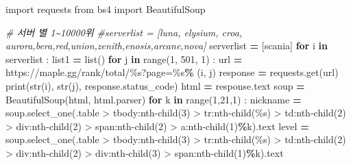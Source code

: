 \documentclass[
]{article}
\newenvironment{Shaded}{\begin{snugshade}}{\end{snugshade}}
\newcommand{\BuiltInTok}[1]{#1}
\newcommand{\CommentTok}[1]{\textcolor[rgb]{0.56,0.35,0.01}{\textit{#1}}}
\newcommand{\ControlFlowTok}[1]{\textcolor[rgb]{0.13,0.29,0.53}{\textbf{#1}}}
\newcommand{\DecValTok}[1]{\textcolor[rgb]{0.00,0.00,0.81}{#1}}
\newcommand{\ImportTok}[1]{#1}
\newcommand{\KeywordTok}[1]{\textcolor[rgb]{0.13,0.29,0.53}{\textbf{#1}}}
\newcommand{\NormalTok}[1]{#1}
\newcommand{\OperatorTok}[1]{\textcolor[rgb]{0.81,0.36,0.00}{\textbf{#1}}}
\newcommand{\SpecialCharTok}[1]{\textcolor[rgb]{0.00,0.00,0.00}{#1}}
\newcommand{\StringTok}[1]{\textcolor[rgb]{0.31,0.60,0.02}{#1}}
\begin{document}
\begin{Shaded}
\begin{Highlighting}[]
\ImportTok{import}\NormalTok{ requests}
\ImportTok{from}\NormalTok{ bs4 }\ImportTok{import}\NormalTok{ BeautifulSoup}

\CommentTok{\# 서버 별 1\textasciitilde{}10000위}
\CommentTok{\#serverlist = [\textquotesingle{}luna\textquotesingle{}, \textquotesingle{}elysium\textquotesingle{}, \textquotesingle{}croa\textquotesingle{}, \textquotesingle{}aurora\textquotesingle{},\textquotesingle{}bera\textquotesingle{},\textquotesingle{}red\textquotesingle{},\textquotesingle{}union\textquotesingle{},\textquotesingle{}zenith\textquotesingle{},\textquotesingle{}enosis\textquotesingle{},\textquotesingle{}arcane\textquotesingle{},\textquotesingle{}nova\textquotesingle{}]}
\NormalTok{serverlist }\OperatorTok{=}\NormalTok{ [}\StringTok{\textquotesingle{}scania\textquotesingle{}}\NormalTok{]}
\ControlFlowTok{for}\NormalTok{ i }\KeywordTok{in}\NormalTok{ serverlist :}
\NormalTok{    list1 }\OperatorTok{=} \BuiltInTok{list}\NormalTok{()}
    \ControlFlowTok{for}\NormalTok{ j }\KeywordTok{in} \BuiltInTok{range}\NormalTok{(}\DecValTok{1}\NormalTok{, }\DecValTok{501}\NormalTok{, }\DecValTok{1}\NormalTok{) :}
\NormalTok{        url }\OperatorTok{=} \StringTok{\textquotesingle{}https://maple.gg/rank/total/}\SpecialCharTok{\%s}\StringTok{?page=}\SpecialCharTok{\%s}\StringTok{\textquotesingle{}}\OperatorTok{\%}\NormalTok{ (i, j)}
\NormalTok{        response }\OperatorTok{=}\NormalTok{ requests.get(url)}
        \BuiltInTok{print}\NormalTok{(}\BuiltInTok{str}\NormalTok{(i), }\BuiltInTok{str}\NormalTok{(j), response.status\_code)}
\NormalTok{        html }\OperatorTok{=}\NormalTok{ response.text}
\NormalTok{        soup }\OperatorTok{=}\NormalTok{ BeautifulSoup(html, }\StringTok{\textquotesingle{}html.parser\textquotesingle{}}\NormalTok{)}
        \ControlFlowTok{for}\NormalTok{ k }\KeywordTok{in} \BuiltInTok{range}\NormalTok{(}\DecValTok{1}\NormalTok{,}\DecValTok{21}\NormalTok{,}\DecValTok{1}\NormalTok{) :}
\NormalTok{            nickname }\OperatorTok{=}\NormalTok{ soup.select\_one(}\StringTok{\textquotesingle{}.table \textgreater{} tbody:nth{-}child(3) \textgreater{} tr:nth{-}child(}\SpecialCharTok{\%s}\StringTok{) \textgreater{} td:nth{-}child(2) \textgreater{} div:nth{-}child(2) \textgreater{} span:nth{-}child(2) \textgreater{} a:nth{-}child(1)\textquotesingle{}}\OperatorTok{\%}\NormalTok{k).text}
\NormalTok{            level }\OperatorTok{=}\NormalTok{ soup.select\_one(}\StringTok{\textquotesingle{}.table \textgreater{} tbody:nth{-}child(3) \textgreater{} tr:nth{-}child(}\SpecialCharTok{\%s}\StringTok{) \textgreater{} td:nth{-}child(2) \textgreater{} div:nth{-}child(2) \textgreater{} div:nth{-}child(3) \textgreater{} span:nth{-}child(1)\textquotesingle{}}\OperatorTok{\%}\NormalTok{k).text}

\end{Highlighting}
\end{Shaded}
\end{document}
